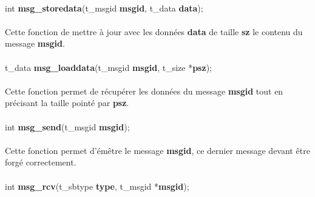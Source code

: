 \documentclass[10pt,a4wide]{article}
\begin{document}
\paragraph{}

\hspace{1.5cm}int \textbf{msg\_storedata}(t\_msgid \textbf{msgid},
                                          t\_data \textbf{data});

\paragraph{}

Cette fonction de mettre \`a jour avec les donn\'ees \textbf{data} de taille \textbf{sz} le contenu du message \textbf{msgid}.

\paragraph{}

\hspace{1.5cm}t\_data \textbf{msg\_loaddata}(t\_msgid \textbf{msgid},
                                             t\_size *\textbf{psz});

\paragraph{}

Cette fonction permet de r\'ecup\'erer les donn\'ees du message \textbf{msgid} tout en pr\'ecisant la taille point\'e par \textbf{psz}.

\paragraph{}

\hspace{1.5cm}int \textbf{msg\_send}(t\_msgid \textbf{msgid});

\paragraph{}

Cette fonction permet d'\'em\^etre le message \textbf{msgid}, ce dernier message devant \^etre forg\'e correctement.

\paragraph{}

\hspace{1.5cm}int \textbf{msg\_rcv}(t\_sbtype \textbf{type},
			       	    t\_msgid *\textbf{msgid});
\end{document}
